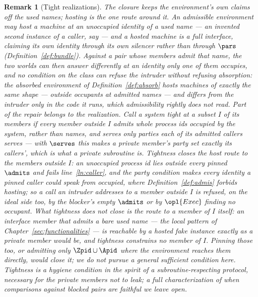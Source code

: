 \documentclass[10pt,oneside,openany]{book}
\theoremstyle{accentdef}
\newtheorem{remark}[definition]{Remark}
\theoremstyle{accentplain}
\begin{document}
\begin{remark}[Tight realizations]\label{rem:tight}
The closure keeps the environment's own claims off the used names; hosting is the one route
around it. An admissible environment may host a machine at an \emph{unoccupied} identity of a
used name --- an invented second instance of a caller, say --- and a hosted machine is a full
interface, claiming its own identity through its own silencer rather than through $\pars$
(Definition~\ref{def:bundle}). Against a pair whose members admit that name, the two worlds can then
answer differently at an identity only one of them occupies, and no condition on the class can
refuse the intruder without refusing absorption: the absorbed environment of
Definition~\ref{def:absorb} hosts machines of exactly the same shape --- outside occupants at
admitted names --- and differs from the intruder only in the code it runs, which admissibility
rightly does not read. Part of the repair belongs to the realization. Call a system \emph{tight at} a
subset $I$ of its members if every member outside $I$ admits whole process ids occupied by the
system, rather than names, and serves only parties each of its admitted callers serves --- with
$\serves$ this makes a private member's party set exactly its callers', which is what a private
subroutine is. Tightness closes the host route \emph{to the members outside $I$}: an unoccupied
process id lies outside every pinned $\admits$ and fails line~\ref{ln:caller}, and the party
condition makes every identity a pinned caller could speak from occupied, where
Definition~\ref{def:admis} forbids hosting; so a call an intruder addresses to a member outside
$I$ is refused, on the ideal side too, by the blocker's empty $\admits$ or by $\opl{Exec}$
finding no occupant. What tightness does \emph{not} close is the route to a member of $I$ itself:
an interface member that admits a bare used name --- the local pattern of
Chapter~\ref{sec:functionalities} --- is reachable by a hosted fake instance exactly as a private
member would be, and tightness constrains no member of $I$. Pinning those too, or admitting only
$\Zpid \cup \Apid$ where the environment reaches them directly, would close it; we do not pursue a
general sufficient condition here. Tightness is a hygiene condition in the spirit of a
subroutine-respecting protocol, necessary for the private members not to leak; a full
characterization of when comparisons against blocked pairs are faithful we leave open.
\end{remark}


\end{document}

